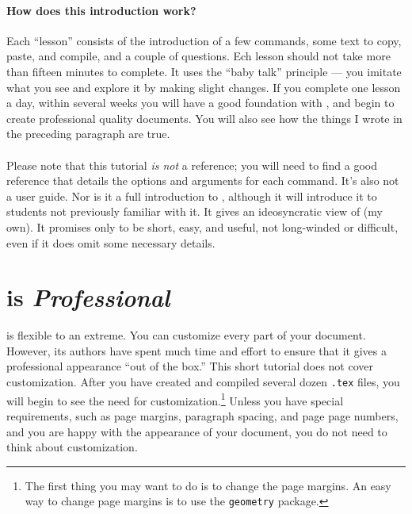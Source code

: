 \documentclass[letterpaper]{article}
\begin{document}
    \paragraph{How does this introduction work?}Each ``lesson'' consists of the introduction of a few commands, some text to copy, paste, and compile, and a couple of questions. Ech lesson should not take more than fifteen minutes to complete. It uses the ``baby talk'' principle --- you imitate what you see and explore it by making slight changes. If you complete one lesson a day, within several weeks you will have a good foundation with \LaTeXe{}, and begin to create professional quality documents. You will also see how the things I wrote in the preceding paragraph are true.

    \paragraph{}Please note that this tutorial \textit{is not} a \LaTeXe{} reference; you will need to find a good reference that details the options and arguments for each command. It's also not a user guide. Nor is it a full introduction to \LaTeXe{}, although it will introduce it to students not previously familiar with it. It gives an ideosyncratic view of \LaTeXe{} (my own). It promises only to be short, easy, and useful, not long-winded or difficult, even if it does omit some necessary details. 

    

    \section*{\LaTeXe{} is \textit{Professional}}

    \LaTeXe{} is flexible to an extreme. You can customize every part of your document. However, its authors have spent much time and effort to ensure that it gives a professional appearance ``out of the box.'' This short tutorial does not cover customization. After you have created and compiled several dozen \texttt{.tex} files, you will begin to see the need for customization.\footnote{The first thing you may want to do is to change the page margins. An easy way to change page margins is to use the \texttt{geometry} package.} Unless you have special requirements, such as page margins, paragraph spacing, and page page numbers, and you are happy with the appearance of your document, you do not need to think about customization.

    
\end{document}
